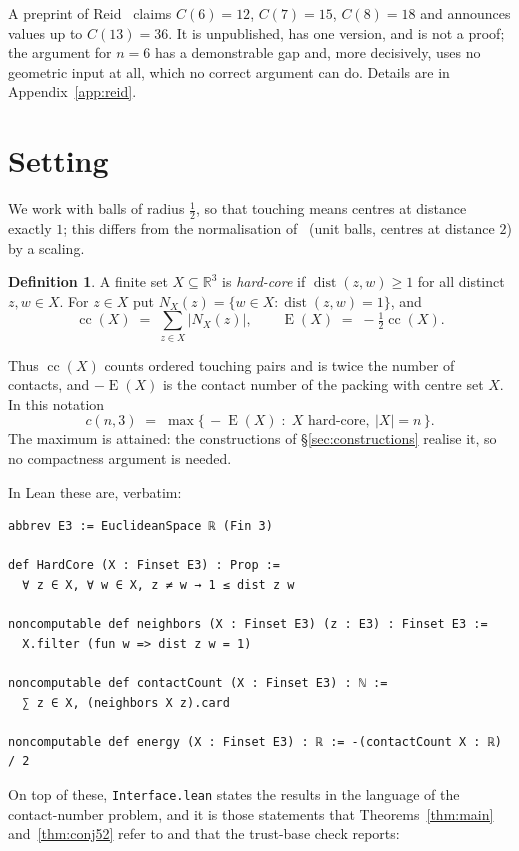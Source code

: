 \documentclass[11pt,a4paper]{article}
\theoremstyle{plain}
\theoremstyle{definition}
\newtheorem{definition}[theorem]{Definition}
\newcommand{\R}{\mathbb{R}}
\newcommand{\card}[1]{\lvert #1 \rvert}
\begin{document}
A preprint of Reid~\cite{Reid2016} claims $C(6)=12$, $C(7)=15$, $C(8)=18$ and announces
values up to $C(13)=36$. It is unpublished, has one version, and is not a proof; the
argument for $n=6$ has a demonstrable gap and, more decisively, uses no geometric input
at all, which no correct argument can do. Details are in
Appendix~\ref{app:reid}.

\section{Setting}
\label{sec:setting}

We work with balls of radius $\tfrac12$, so that touching means centres at distance
exactly $1$; this differs from the normalisation of~\cite{BezdekKhan2018} (unit balls,
centres at distance $2$) by a scaling.

\begin{definition}
A finite set $X \subseteq \R^3$ is \emph{hard-core} if $\operatorname{dist}(z,w) \ge 1$
for all distinct $z,w \in X$. For $z \in X$ put
$N_X(z) = \{ w \in X : \operatorname{dist}(z,w) = 1 \}$, and
\[
  \operatorname{cc}(X) \;=\; \sum_{z \in X} \card{N_X(z)},
  \qquad
  \operatorname{E}(X) \;=\; -\tfrac12 \operatorname{cc}(X).
\]
\end{definition}

Thus $\operatorname{cc}(X)$ counts ordered touching pairs and is twice the number of
contacts, and $-\operatorname{E}(X)$ is the contact number of the packing with centre
set $X$. In this notation
\[
  c(n,3) \;=\; \max\{\, -\operatorname{E}(X) \;:\; X \text{ hard-core},\ \card X = n \,\}.
\]
The maximum is attained: the constructions of \S\ref{sec:constructions} realise it, so
no compactness argument is needed.

In Lean these are, verbatim:

\begin{Verbatim}
abbrev E3 := EuclideanSpace ℝ (Fin 3)

def HardCore (X : Finset E3) : Prop :=
  ∀ z ∈ X, ∀ w ∈ X, z ≠ w → 1 ≤ dist z w

noncomputable def neighbors (X : Finset E3) (z : E3) : Finset E3 :=
  X.filter (fun w => dist z w = 1)

noncomputable def contactCount (X : Finset E3) : ℕ :=
  ∑ z ∈ X, (neighbors X z).card

noncomputable def energy (X : Finset E3) : ℝ := -(contactCount X : ℝ) / 2
\end{Verbatim}

\noindent On top of these, \texttt{Interface.lean} states the results in the language of
the contact-number problem, and it is those statements that
Theorems~\ref{thm:main} and~\ref{thm:conj52} refer to and that the
trust-base check reports:
\end{document}
